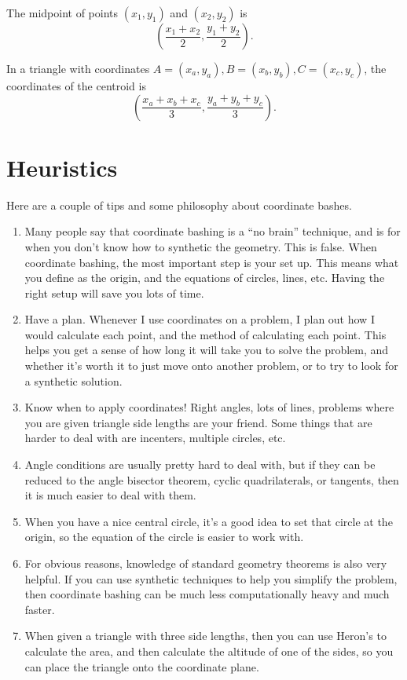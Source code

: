 \documentclass[11pt]{scrartcl}
\begin{document}
\begin{theorem}[Midpoint]
The midpoint of points $(x_1, y_1)$ and $(x_2, y_2)$ is \[\left(\frac{x_1+x_2}{2},\frac{y_1+y_2}{2}\right).\]
\end{theorem}

\begin{theorem}
In a triangle with coordinates $A=(x_a,y_a),B=(x_b,y_b),C=(x_c,y_c)$, the coordinates of the centroid is
\[\left(\frac{x_a+x_b+x_c}{3},\frac{y_a+y_b+y_c}{3}\right).\]
\end{theorem}

\section{Heuristics}

Here are a couple of tips and some philosophy about coordinate bashes.

\begin{enumerate}
    \item Many people say that coordinate bashing is a ``no brain'' technique, and is for when you don't know how to synthetic the geometry. This is false. When coordinate bashing, the most important step is your set up. This means what you define as the origin, and the equations of circles, lines, etc. Having the right setup will save you lots of time.
    \item Have a plan. Whenever I use coordinates on a problem, I plan out how I would calculate each point, and the method of calculating each point. This helps you get a sense of how long it will take you to solve the problem, and whether it's worth it to just move onto another problem, or to try to look for a synthetic solution. 
    \item Know when to apply coordinates! Right angles, lots of lines, problems where you are given triangle side lengths are your friend. Some things that are harder to deal with are incenters, multiple circles, etc.
    \item Angle conditions are usually pretty hard to deal with, but if they can be reduced to the angle bisector theorem, cyclic quadrilaterals, or tangents, then it is much easier to deal with them. 
    \item When you have a nice central circle, it's a good idea to set that circle at the origin, so the equation of the circle is easier to work with.
    \item For obvious reasons, knowledge of standard geometry theorems is also very helpful. If you can use synthetic techniques to help you simplify the problem, then coordinate bashing can be much less computationally heavy and much faster. 
    \item When given a triangle with three side lengths, then you can use Heron's to calculate the area, and then calculate the altitude of one of the sides, so you can place the triangle onto the coordinate plane. 
\end{enumerate}
\end{document}
